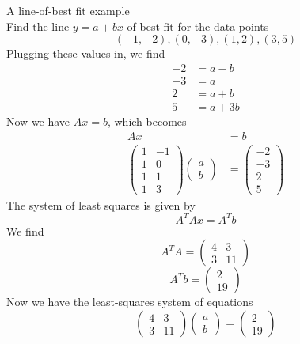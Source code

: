 \documentclass[journal, letterpaper]{IEEEtran}
\begin{document}
    \begin{myboxg}{A line-of-best fit example} \\
        Find the line $y = a + bx$ of best fit for the data points
        $$ (-1, -2), (0, -3), (1, 2), (3, 5)$$
        Plugging these values in, we find
        \begin{align*}
            -2 &= a - b \\ 
            -3 &= a \\
            2 &= a + b \\
            5 &= a + 3b
        \end{align*}
        Now we have $Ax = b$, which becomes
        \begin{align*}
        Ax &= b \\
        \begin{pmatrix}
            1 & -1 \\ 1 & 0 \\ 1 & 1 \\ 1 & 3
        \end{pmatrix} \begin{pmatrix}
            a \\ b
        \end{pmatrix} &= \begin{pmatrix}
            -2 \\ -3 \\ 2  \\ 5
        \end{pmatrix}
    \end{align*}
    The system of least squares is given by
    $$ A^TAx = A^Tb$$
    We find
    $$ A^TA = \begin{pmatrix}
        4 & 3 \\ 3 & 11
    \end{pmatrix}$$
    $$ A^Tb = \begin{pmatrix}
        2 \\ 19
    \end{pmatrix}$$
    Now we have the least-squares system of equations
    $$
    \begin{pmatrix}
        4 & 3 \\ 3 & 11
    \end{pmatrix} \begin{pmatrix}
        a \\ b
    \end{pmatrix} = \begin{pmatrix}
        2 \\ 19
    \end{pmatrix}
$$
\end{myboxg}
\end{document}
